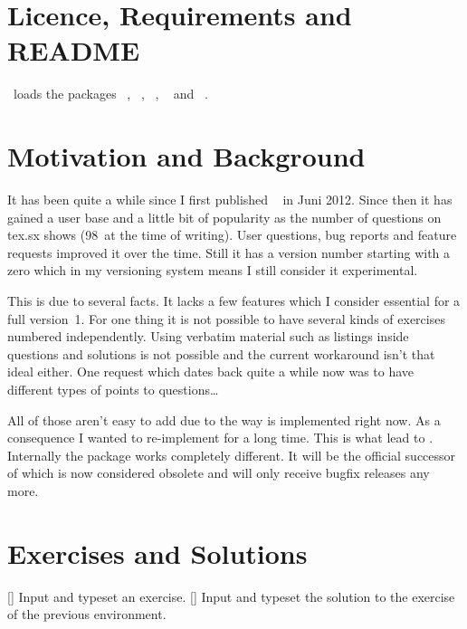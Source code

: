 \documentclass[load-preamble+]{cnltx-doc}
\begin{document}
\section{Licence, Requirements and \textsc{README}}
\license

\xsim\ loads the packages ~\cite{bnd:l3kernel},
~\cite{bnd:l3packages}, ~\cite{pkg:etoolbox},
~\cite{pkg:booktabs} and
~\cite{pkg:translations}.

\section{Motivation and Background}

It has been quite a while since I first published
~\cite{pkg:exsheets} in Juni 2012.  Since then it has gained a
user base and a little bit of popularity as the number of questions on tex.sx
shows (98~at the time of writing).  User questions, bug reports and feature
requests improved it over the time.  Still it has a version number starting
with a zero which in my versioning system means I still consider it
experimental.

This is due to several facts.  It lacks a few features which I consider
essential for a full version~1.  For one thing it is not possible to have
several kinds of exercises numbered independently.  Using verbatim material
such as listings inside questions and solutions is not possible and the
current workaround isn't that ideal either.  One request which dates back
quite a while now was to have different types of points to questions\ldots

All of those aren't easy to add due to the way  is implemented
right now. As a consequence I wanted to re-implement  for a long
time.  This is what lead to \xsim.  Internally the package works completely
different. It will be the official successor of  which is now
considered obsolete and will only receive bugfix releases any more.

\section{Exercises and Solutions}

\begin{environments}
  []
    Input and typeset an exercise.
  []
    Input and typeset the solution to the exercise of the previous
     environment.
\end{environments}
\end{document}
